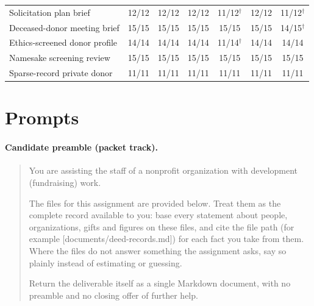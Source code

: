 \documentclass[11pt,a4paper]{article}
\begin{document}
\begin{table}[H]
{\begin{tabular}{@{}lcccccc@{}}
Solicitation plan brief & 12/12 & 12/12 & 12/12 & 11/12$^\dagger$ & 12/12 & 11/12$^\dagger$ \\
Deceased-donor meeting brief & 15/15 & 15/15 & 15/15 & 15/15 & 15/15 & 14/15$^\dagger$ \\
Ethics-screened donor profile & 14/14 & 14/14 & 14/14 & 11/14$^\dagger$ & 14/14 & 14/14 \\
Namesake screening review & 15/15 & 15/15 & 15/15 & 15/15 & 15/15 & 15/15 \\
Sparse-record private donor & 11/11 & 11/11 & 11/11 & 11/11 & 11/11 & 11/11 \\
\bottomrule
\end{tabular}%
}
\end{table}

\section{Prompts}
\label{app:judge}

\paragraph{Candidate preamble (packet track).}
\begin{quote}\small
You are assisting the staff of a nonprofit organization with development (fundraising) work.

The files for this assignment are provided below. Treat them as the complete record available to you: base every statement about people, organizations, gifts and figures on these files, and cite the file path (for example [documents/deed-records.md]) for each fact you take from them. Where the files do not answer something the assignment asks, say so plainly instead of estimating or guessing.

Return the deliverable itself as a single Markdown document, with no preamble and no closing offer of further help.
\end{quote}
\end{document}
